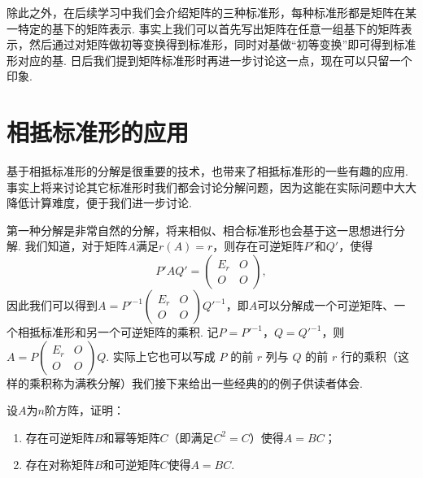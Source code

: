 除此之外，在后续学习中我们会介绍矩阵的三种标准形，每种标准形都是矩阵在某一特定的基下的矩阵表示. 事实上我们可以首先写出矩阵在任意一组基下的矩阵表示，然后通过对矩阵做初等变换得到标准形，同时对基做``初等变换''即可得到标准形对应的基. 日后我们提到矩阵标准形时再进一步讨论这一点，现在可以只留一个印象.

\section{相抵标准形的应用}

基于相抵标准形的分解是很重要的技术，也带来了相抵标准形的一些有趣的应用. 事实上将来讨论其它标准形时我们都会讨论分解问题，因为这能在实际问题中大大降低计算难度，便于我们进一步讨论.

第一种分解是非常自然的分解，将来相似、相合标准形也会基于这一思想进行分解. 我们知道，对于矩阵$A$满足$r(A)=r$，则存在可逆矩阵$P'$和$Q'$，使得
\[P'AQ'=\begin{pmatrix}
        E_r & O \\ O & O
    \end{pmatrix},\]
因此我们可以得到$A=P'^{-1}\begin{pmatrix}
        E_r & O \\ O & O
    \end{pmatrix}Q'^{-1}$，即$A$可以分解成一个可逆矩阵、一个相抵标准形和另一个可逆矩阵的乘积. 记$P=P'^{-1}$，$Q=Q'^{-1}$，则$A=P\begin{pmatrix}
        E_r & O \\ O & O
    \end{pmatrix}Q$. 实际上它也可以写成 $P$ 的前 $r$ 列与 $Q$ 的前 $r$ 行的乘积（这样的乘积称为满秩分解）我们接下来给出一些经典的的例子供读者体会.

\begin{example}{}{}
    设$A$为$n$阶方阵，证明：
    \begin{enumerate}
        \item 存在可逆矩阵$B$和幂等矩阵$C$（即满足$C^2=C$）使得$A=BC$；
        \item 存在对称矩阵$B$和可逆矩阵$C$使得$A=BC$.
    \end{enumerate}
\end{example}

